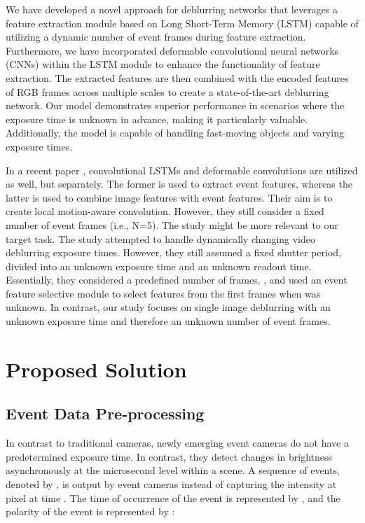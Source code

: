 \documentclass{article}
\begin{document}
We have developed a novel approach for deblurring networks that leverages a feature extraction module based on Long Short-Term Memory (LSTM) capable of utilizing a dynamic number of event frames during feature extraction. Furthermore, we have incorporated deformable convolutional neural networks (CNNs) within the LSTM module to enhance the functionality of feature extraction. The extracted features are then combined with the encoded features of RGB frames across multiple scales to create a state-of-the-art deblurring network. Our model demonstrates superior performance in scenarios where the exposure time is unknown in advance, making it particularly valuable. Additionally, the model is capable of handling fast-moving objects and varying exposure times.

In a recent paper \cite{vitoria2023event}, convolutional LSTMs and deformable convolutions are utilized as well, but separately. The former is used to extract event features, whereas the latter is used to combine image features with event features. Their aim is to create local motion-aware convolution. However, they still consider a fixed number of event frames (i.e., N=5). The study \cite{kim2022event} might be more relevant to our target task. The study \cite{kim2022event} attempted to handle dynamically changing video deblurring exposure times. However, they still assumed a fixed shutter period, divided into an unknown exposure time and an unknown readout time. Essentially, they considered a predefined number of frames, , and used an event feature selective module to select features from the first  frames when  was unknown. In contrast, our study focuses on single image deblurring with an unknown exposure time and therefore an unknown number of event frames.

\section{Proposed Solution}
\subsection{Event Data Pre-processing}

In contrast to traditional cameras, newly emerging event cameras do not have a predetermined exposure time. In contrast, they detect changes in brightness asynchronously at the microsecond level within a scene. A sequence of events, denoted by , is output by event cameras instead of capturing the intensity at pixel  at time . The time of occurrence of the event is represented by , and the polarity of the event is represented by :
\end{document}
